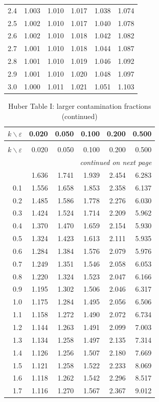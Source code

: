 \begin{center}
\begin{longtable}{rrrrrr}
2.4&1.003&1.010&1.017&1.038&1.074\\
2.5&1.002&1.010&1.017&1.040&1.078\\
2.6&1.002&1.010&1.018&1.042&1.082\\
2.7&1.001&1.010&1.018&1.044&1.087\\
2.8&1.001&1.010&1.019&1.046&1.092\\
2.9&1.001&1.010&1.020&1.048&1.097\\
3.0&1.000&1.011&1.021&1.051&1.103\\
\end{longtable}
\begin{longtable}{rrrrrr}
\caption{Huber Table I: larger contamination fractions}
\label{tab:p15-huber-table-one-large}\\
\(k\backslash\varepsilon\)&0.020&0.050&0.100&0.200&0.500\\\hline
\endfirsthead
\caption[]{Huber Table I: larger contamination fractions (continued)}\\
\(k\backslash\varepsilon\)&0.020&0.050&0.100&0.200&0.500\\\hline
\endhead
\hline\multicolumn{6}{r}{\emph{continued on next page}}\\
\endfoot
\endlastfoot
0.0&1.636&1.741&1.939&2.454&6.283\\
0.1&1.556&1.658&1.853&2.358&6.137\\
0.2&1.485&1.586&1.778&2.276&6.030\\
0.3&1.424&1.524&1.714&2.209&5.962\\
0.4&1.370&1.470&1.659&2.154&5.930\\
0.5&1.324&1.423&1.613&2.111&5.935\\
0.6&1.284&1.384&1.576&2.079&5.976\\
0.7&1.249&1.351&1.546&2.058&6.053\\
0.8&1.220&1.324&1.523&2.047&6.166\\
0.9&1.195&1.302&1.506&2.046&6.317\\
1.0&1.175&1.284&1.495&2.056&6.506\\
1.1&1.158&1.272&1.490&2.072&6.734\\
1.2&1.144&1.263&1.491&2.099&7.003\\
1.3&1.134&1.258&1.497&2.135&7.314\\
1.4&1.126&1.256&1.507&2.180&7.669\\
1.5&1.121&1.258&1.522&2.233&8.069\\
1.6&1.118&1.262&1.542&2.296&8.517\\
1.7&1.116&1.270&1.567&2.367&9.012\\

\end{longtable}
\end{center}
